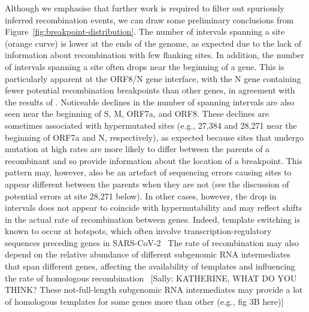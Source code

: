 \documentclass{article}
\begin{document}
Although we emphasise that further work is required to filter out spuriously inferred recombination events,
we can draw some preliminary conclusions from Figure~\ref{fig:breakpoint-distribution}.
The number of intervals spanning a site (orange curve) is lower at the ends of the genome,
as expected due to the lack of information about recombination with few flanking sites.
In addition, the number of intervals spanning a site often
drops near the beginning of a gene.
This is particularly apparent at the ORF8/N gene interface,
with the N gene containing fewer potential recombination breakpoints
than other genes, in agreement with the results of \cite{Turakhia2022-it}.
Noticeable declines in the number of spanning intervals are also
seen near the beginning of S, M, ORF7a, and ORF8.
These declines are sometimes associated with hypermutated sites (e.g., 27,384 and 28,271
near the beginning of ORF7a and N, respectively), as expected because sites that
undergo mutation at high rates are more likely to differ between the
parents of a recombinant and so provide information about the location of a breakpoint.
This pattern may, however, also be an artefact of sequencing errors causing sites
to appear different between the parents when they are not
(see the discussion of potential errors at site 28,271 below).
In other cases, however, the drop in intervals does not appear to
coincide with hypermutability and may reflect shifts in the actual
rate of recombination between genes.
Indeed, template switching is known to occur at hotspots,
which often involve transcription-regulatory sequences preceding genes
in SARS-CoV-2~\citep{Yang2021-characterizing}
The rate of recombination may also depend on the relative abundance
of different subgenomic RNA intermediates that span different genes,
affecting the availability of templates and influencing the rate of
homologous recombination~\citep{Kim2020-gt,Zou2021-sars}
[Sally: KATHERINE, WHAT DO YOU THINK?  These not-full-length subgenomic RNA intermediates may provide a lot of homologous templates for some genes more than other (e.g., fig 3B here)]
\end{document}
